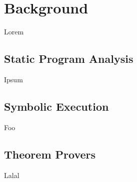 
\chapter{Background}\label{c:background}
Lorem\cite{chaurasia2017data}

\section{Static Program Analysis}
Ipsum

\section{Symbolic Execution}
Foo

\section{Theorem Provers}
Lalal